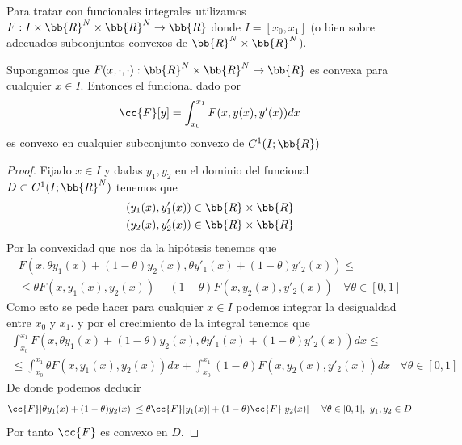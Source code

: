 Para tratar con funcionales integrales utilizamos $F:I\times \bb{R}^N \times \bb{R}^N \to \bb{R}$ donde $I=[x_0,x_1]$ (o bien sobre adecuados subconjuntos convexos de $\bb{R}^N \times \bb{R}^N$).

\begin{lema}
    Supongamos que $F(x,\cdot,\cdot):\bb{R}^N \times \bb{R}^N \to \bb{R}$ es convexa para cualquier $x\in I$. Entonces el funcional dado por 
    \begin{gather*}
        \cc{F}[y] = \int_{x_0}^{x_1} F(x,y(x),y'(x)) dx
    \end{gather*}
    es convexo en cualquier subconjunto convexo de $C^1(I;\bb{R})$
    \begin{proof}
        Fijado $x\in I$ y dadas $y_1,y_2$ en el dominio del funcional $D\subset C^1(I;\bb{R}^N)$ tenemos que 
        \begin{gather*}
            (y_1(x), y_1'(x)) \in \bb{R}\times \bb{R}\\
            (y_2(x), y_2'(x)) \in \bb{R}\times \bb{R}
        \end{gather*}
        Por la convexidad que nos da la hipótesis tenemos que 
        \begin{gather*}
            F(x, \theta y_1(x) + (1-\theta) y_2(x), \theta y'_1(x) + (1-\theta) y'_2(x)) \leq\\
            \leq \theta F(x, y_1(x), y_2(x)) + (1-\theta) F(x, y_2(x), y'_2(x)) \ \ \ \ \forall  \theta \in [0,1]
        \end{gather*}
        Como esto se pede hacer para cualquier $x\in I$ podemos integrar la desigualdad entre $x_0$ y $x_1$. y por el crecimiento de la integral tenemos que 
        \begin{gather*}
            \int_{x_0}^{x_1} F(x, \theta y_1(x) + (1-\theta) y_2(x), \theta y'_1(x) + (1-\theta) y'_2(x)) dx \leq\\
            \leq \int_{x_0}^{x_1} \theta F(x, y_1(x), y_2(x))dx + \int_{x_0}^{x_1}(1-\theta) F(x, y_2(x), y'_2(x)) dx\ \ \ \ \forall  \theta \in [0,1]
        \end{gather*}
        De donde podemos deducir
        \begin{gather*}
            \cc{F}[\theta y_1(x) + (1-\theta) y_2(x)] \leq \theta \cc{F}[y_1(x)] + (1-\theta) \cc{F}[y_2(x)] \ \ \ \ \forall \theta \in [0,1],\ y_1,y_2\in D
        \end{gather*}
        Por tanto $\cc{F}$ es convexo en $D$.
    \end{proof}
\end{lema}

